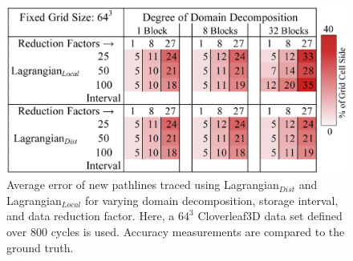 \begin{figure}[!b]
\centering
\vspace{-2mm}
\includegraphics[width=\linewidth]{Images/strongscaling.eps}
\caption{Average error of new pathlines traced using Lagrangian$_{Dist}$ and Lagrangian$_{Local}$ for varying domain decomposition, storage interval, and data reduction factor. Here, a $64^{3}$ Cloverleaf3D data set defined over 800 cycles is used. Accuracy measurements are compared to the ground truth.} 
\vspace{-2mm}
\label{fig:strongscaling}
\end{figure}
